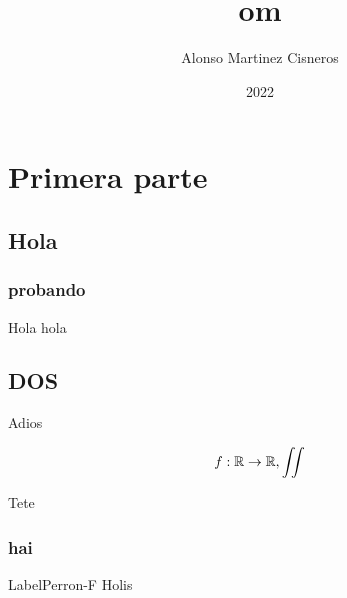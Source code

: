 \documentclass[colorful]{sty/itam-thesis}
\author{Alonso Martinez Cisneros}
\title{om}
\date{2022}
\begin{document}
\frontmatter
\maketitle
\makefrontmatter
{}

\mainmatter

\part{Primera parte}
\chapter{Hola}

\lipsum[1-10]

\section{probando}
Hola hola

\chapter{DOS}

Adios

\begin{equation}
	f: \mathbb{R} \to \mathbb{R}, \iint
\end{equation}

Tete

\section{hai}

\begin{mytheo}{Label}{Perron-F}
	Holis
\end{mytheo}
\end{document}
